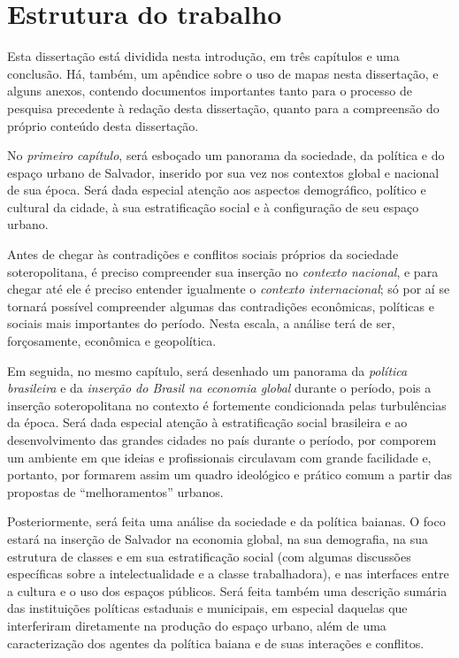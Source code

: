 \section[Estrutura do trabalho]{Estrutura do trabalho}\label{sec:estrutrab}

Esta dissertação está dividida nesta introdução, em três capítulos e uma conclusão. Há, também, 
um apêndice sobre o uso de mapas nesta dissertação, e alguns anexos, contendo documentos importantes tanto para o processo de pesquisa precedente à redação desta dissertação, quanto para a compreensão do próprio conteúdo desta dissertação.

No \textit{primeiro capítulo}, será esboçado um panorama da sociedade, da política e do espaço urbano de Salvador, inserido por sua vez nos contextos global e nacional de sua época. Será dada especial atenção aos aspectos demográfico, político e cultural da cidade, à sua estratificação social e à configuração de seu espaço urbano. 

Antes de chegar às contradições e conflitos sociais próprios da sociedade soteropolitana, é preciso compreender sua inserção no \textit{contexto nacional}, e para chegar até ele é preciso entender igualmente o \textit{contexto internacional}; só por aí se tornará possível compreender algumas das contradições econômicas, políticas e sociais mais importantes do período. Nesta escala, a análise terá de ser, forçosamente, econômica e geopolítica. 

Em seguida, no mesmo capítulo, será desenhado um panorama da \textit{política brasileira} e da \textit{inserção do Brasil na economia global} durante o período, pois a inserção soteropolitana no contexto é fortemente condicionada pelas turbulências da época. Será dada especial atenção à estratificação social brasileira e ao desenvolvimento das grandes cidades no país durante o período, por comporem um ambiente em que ideias e profissionais circulavam com grande facilidade e, portanto, por formarem assim um quadro ideológico e prático comum a partir das propostas de ``melhoramentos'' urbanos. 

Posteriormente, será feita uma análise da sociedade e da política baianas. O foco estará na inserção de Salvador na economia global, na sua demografia, na sua estrutura de classes e em sua estratificação social (com algumas discussões específicas sobre a intelectualidade e a classe trabalhadora), e nas interfaces entre a cultura e o uso dos espaços públicos. Será feita também uma descrição sumária das instituições políticas estaduais e municipais, em especial daquelas que interferiram diretamente na produção do espaço urbano, além de uma caracterização dos agentes da política baiana e de suas interações e conflitos. 

